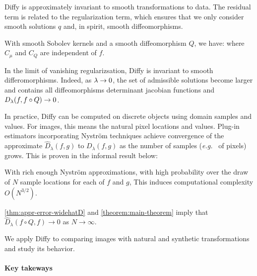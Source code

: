 Diffy is approximately invariant to smooth transformations to data. The residual term is related to the regularization term, which ensures that we only consider smooth solutions $q$ and, in spirit, smooth diffeomorphisms.
\begin{mdframed}
\begin{informaltheorem}
With smooth Sobolev kernels and a smooth diffeomorphism $Q$, we have:
where $C_\mu$ and $C_Q$ are independent of $f$.
\end{informaltheorem}
\end{mdframed}
\noindent In the limit of vanishing regularizsation, Diffy is invariant to smooth differomorphisms. Indeed, as $\lambda \to 0$, the set of admissible solutions become larger and contains all diffeomorphisms determinant jacobian functions and $D_\lambda(f, f\circ Q)\to 0$.

In practice, Diffy can be computed on discrete objects using domain samples and values. For images, this means the natural pixel locations and values. Plug-in estimators incorporating Nyström techniques achieve convergence of the approximate $\hat D_\lambda(f, g)$ to $D_\lambda(f, g)$ as the number of samples (\emph{e.g.\ } of pixels) grows. This is proven in the informal result below:
\begin{mdframed}
\begin{informaltheorem}
With rich enough Nyström approximations, with high probability over the draw of $N$ sample locations for each of $f$ and $g$,
This induces computational complexity $O(N^{3/2})$.
\end{informaltheorem}
\end{mdframed}
\noindent \cref{thm:appr-error-widehatD} and \cref{theorem:main-theorem} imply that $\hat D_\lambda(f\circ Q, f)\to 0$ as $N\to \infty$.

We apply Diffy to comparing images with natural and synthetic transformations and study its behavior.

\paragraph{Key takeways}

